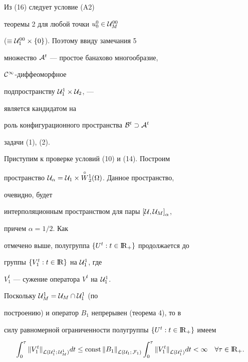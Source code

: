 \begin{note}


Из (16) следует условие (A2)


теоремы 2 для любой точки $u^0_0 \in {\cal U}_M^{00}$


($\equiv {\cal U}_1^{00}\times \{0 \}$). Поэтому ввиду замечания 5


множество ${\cal A}^t$ --- простое банахово многообразие,


${\cal C}^{\infty}$-диффеоморфное


подпространству ${\cal U}_1^1 \times {\cal U}_2$, ---


является кандидатом на


роль конфигурационного пространства ${\cal B}^t \supset {\cal A}^t$


задачи (1), (2).


\end{note}





Приступим к проверке условий (10) и (14). Построим


пространство ${\cal U}_{\alpha}={\cal U}_1 \times


\up{\circ}{W}_2^1 (\Omega)$. Данное пространство,


очевидно, будет


интерполяционным пространством для пары ${[{\cal U}, {\cal U}_M]}_{\alpha}$,


причем $\alpha=1/2$. Как


отмечено выше, полугруппа $\{U^t: t \in {{\mathrm I}\!{\mathrm R}}_+\}$ продолжается до


группы $\{V^t_1: t \in {\mathrm I}\!{\mathrm R} \}$ на ${\cal U}_1^1$, где


$V_1^t$ --- сужение оператора $V^t$ на ${\cal U}_1^1$.


Поскольку ${\cal U}_M^1={\cal U}_M \cap {\cal U}_1^1$ (по


построению) и оператор $B_1$ непрерывен (теорема 4), то в


силу равномерной ограниченности полугруппы $\{U^t: t \in {{\mathrm I}\!{\mathrm R}}_+\}$ имеем


\begin{equation}


\int_0^{\tau} {\| V_1^t \|}_{{\cal L}({\cal U}_1^1;\,{\cal U}_M^1)} dt \leq 


\const {\| B_1 \|}_{{\cal L} ({\cal U}_1; \,{\cal F}_1)}


\int_0^{\tau} {\| V_1^t \|}_{{\cal L}({\cal U}_1^1)} dt < \infty


\quad \forall \tau \in {\R}_+.


\end{equation}


